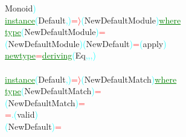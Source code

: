 {\rm{}Monoid}\textcolor{cyan}{)}\\\textcolor{green}{\underline{instance}}\hsspace \textcolor{cyan}{(}{\rm{}Default}\textcolor{cyan}{,}\textcolor{cyan}{)}\hsspace \textcolor{red}{=\ensuremath{\rangle}}\hsspace \textcolor{cyan}{(}{\rm{}NewDefaultModule}\textcolor{cyan}{)}\hsspace \textcolor{green}{\underline{where}}\\\hstab \textcolor{green}{\underline{type}}\hsspace \textcolor{cyan}{(}{\rm{}NewDefaultModule}\textcolor{cyan}{)}\hsspace \textcolor{red}{=}\\\hsspace \textcolor{cyan}{(}{\rm{}NewDefaultModule}\textcolor{cyan}{)}\hsspace \textcolor{cyan}{(}{\rm{}NewDefault}\textcolor{cyan}{)}\hsspace \textcolor{red}{=}\hsspace \textcolor{cyan}{(}{\rm{}apply}\textcolor{cyan}{)}\\\textcolor{green}{\underline{newtype}}\hsspace \textcolor{red}{=}\hsspace \textcolor{green}{\underline{deriving}}\hsspace \textcolor{cyan}{(}{\rm{}Eq}\textcolor{cyan}{,}\textcolor{cyan}{,}\textcolor{cyan}{,}\textcolor{cyan}{)}\\\\\textcolor{green}{\underline{instance}}\hsspace \textcolor{cyan}{(}{\rm{}Default}\textcolor{cyan}{,}\textcolor{cyan}{)}\hsspace \textcolor{red}{=\ensuremath{\rangle}}\hsspace \textcolor{cyan}{(}{\rm{}NewDefaultMatch}\textcolor{cyan}{)}\hsspace \textcolor{green}{\underline{where}}\\\hstab \textcolor{green}{\underline{type}}\hsspace \textcolor{cyan}{(}{\rm{}NewDefaultMatch}\textcolor{cyan}{)}\hsspace \textcolor{red}{=}\\\hsspace \textcolor{cyan}{(}{\rm{}NewDefaultMatch}\textcolor{cyan}{)}\hsspace \textcolor{red}{=}\\\hsspace {}\hsspace \hsspace \hsspace \hsspace \hsspace \hsspace \hsspace \hsspace \hsspace \hsspace \hsspace \hsspace \hsspace \hsspace \hsspace \hsspace \hsspace \hsspace \hsspace \textcolor{red}{=}\hsspace \textcolor{cyan}{.}\hsspace \textcolor{cyan}{(}{\rm{}valid}\textcolor{cyan}{)}\\\hsspace \textcolor{cyan}{(}{\rm{}NewDefault}\textcolor{cyan}{)}\hsspace \hsspace \hsspace \hsspace \textcolor{red}{=}\\\hsspace \hsspace \hsspace \hsspace \hsspace \hsspace \hsspace \hsspace \hsspace \hsspace \hsspace \hsspace 